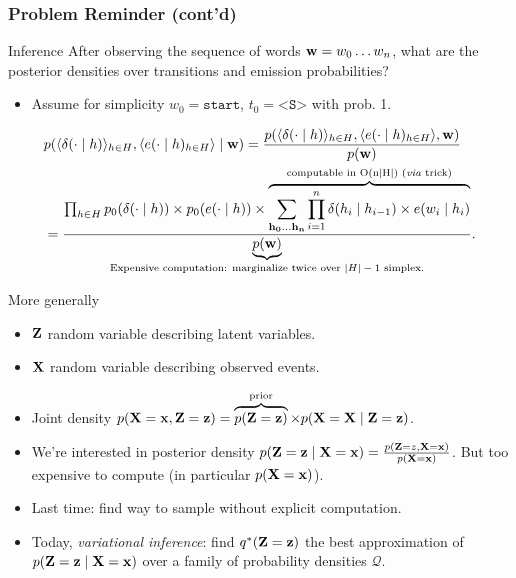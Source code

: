 \documentclass{beamer}
\begin{document}
\begin{frame}
  \frametitle{Problem Reminder (cont'd)}
  \begin{alertblock}{Inference}
    After observing the sequence of words ${\bf w} = w_0 \dots w_n$, what are the posterior densities over transitions and emission probabilities?
    \begin{itemize}
    \item Assume for simplicity $w_0 = \texttt{start}$, $t_0 = \texttt{<S>}$ with prob. 1.
    \end{itemize}
    \[\displaystyle\begin{aligned}
    &p(\langle \delta(\cdot \mid h) \rangle_{h \in H}, \langle e(\cdot \mid h)_{h \in H} \rangle \mid {\bf w}) = \frac{p(\langle \delta(\cdot \mid h) \rangle_{h \in H}, \langle e(\cdot \mid h)_{h \in H} \rangle, {\bf w})}{p( {\bf w})}\\
    &=\frac{\prod_{h \in H} p_0(\delta(\cdot \mid h)) \times  p_0(e(\cdot \mid h)) \times \overbrace{\sum_{{\bf h_0 \dots h_n}} \prod^n_{i=1} \delta(h_i \mid h_{i-1}) \times e(w_i \mid h_i)}^{\textnormal{computable in O(n|H|) } \textnormal{(\emph{via} trick)}} }{\underbrace{p({\bf w})}_{\textnormal{Expensive computation: marginalize twice over $|H|-1$ simplex.}}}.
    \end{aligned}
    \] 
  \end{alertblock}
\end{frame}

\begin{frame}{More generally}
    \begin{itemize}
    \item ${\bf Z}$ random variable describing latent variables.
    \item ${\bf X}$ random variable describing observed events.
    \item Joint density $p({\bf X} = {\bf x}, {\bf Z} = {\bf z} ) = \overbrace{p({\bf Z} = {\bf z})}^{\textnormal{prior}} \times p({\bf X} = {\bf X} \mid {\bf Z} = {\bf z})$.
    \item We're interested in posterior density $p({\bf Z} = {\bf z} \mid {\bf X} = {\bf x}) = \frac{p({\bf Z} = z, {\bf X} = {\bf x})}{p({\bf X}= {\bf x})}$. But too expensive to compute (in particular $p({\bf X}= {\bf x})$).
    \item Last time: find way to sample without explicit computation.
    \item Today, \emph{variational inference}: find $q^*({\bf Z} = {\bf z})$ the best approximation of $p({\bf Z} = {\bf z} \mid {\bf X} = {\bf x})$  over a family of probability densities $\mathcal{Q}$.
    \end{itemize}
\end{frame}
\end{document}
